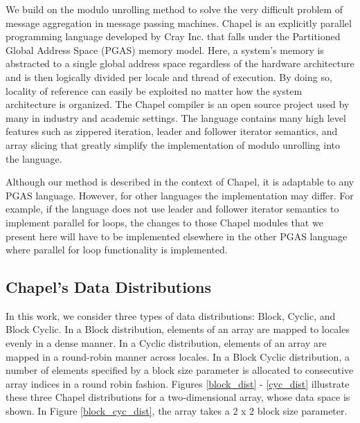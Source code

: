 We build on the modulo unrolling method to solve the very difficult problem of message aggregation in message passing machines. Chapel is an explicitly parallel programming language developed by Cray Inc. that falls under the Partitioned Global Address Space (PGAS) memory model. Here, a system's memory is abstracted to a single global address space regardless of the hardware architecture and is then logically divided per locale and thread of execution. By doing so, locality of reference can easily be exploited no matter how the system architecture is organized. The Chapel compiler is an open source project used by many in industry and academic settings. The language contains many high level features such as zippered iteration, leader and follower iterator semantics, and array slicing that greatly simplify the implementation of modulo unrolling into the language.

Although our method is described in the context of Chapel, it is adaptable to any PGAS language. However, for other languages the implementation may differ. For example, if the language does not use leader and follower iterator semantics to implement parallel for loops, the changes to those Chapel modules that we present here will have to be implemented elsewhere in the other PGAS language where parallel for loop functionality is implemented.

\subsection{Chapel's Data Distributions} 

In this work, we consider three types of data distributions: Block, Cyclic, and Block Cyclic. In a Block distribution, elements of an array are mapped to locales evenly in a dense manner. In a Cyclic distribution, elements of an array are mapped in a round-robin manner across locales. In a Block Cyclic distribution, a number of elements specified by a block size parameter is allocated to consecutive array indices in a round robin fashion. Figures \ref{block_dist} - \ref{cyc_dist} illustrate these three Chapel distributions for a two-dimensional array, whose data space is shown. In Figure \ref{block_cyc_dist}, the array takes a 2 x 2 block size parameter. 

